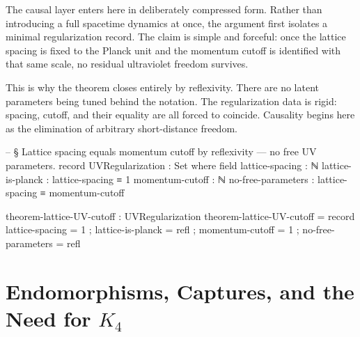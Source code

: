 \documentclass[11pt,a4paper]{book}
\begin{document}
The causal layer enters here in deliberately compressed form. Rather than introducing a full spacetime dynamics at once, the argument first isolates a minimal regularization record. The claim is simple and forceful: once the lattice spacing is fixed to the Planck unit and the momentum cutoff is identified with that same scale, no residual ultraviolet freedom survives.

This is why the theorem closes entirely by reflexivity. There are no latent parameters being tuned behind the notation. The regularization data is rigid: spacing, cutoff, and their equality are all forced to coincide. Causality begins here as the elimination of arbitrary short-distance freedom.

\begin{center}
\end{center}

\begin{code}

-- § Lattice spacing equals momentum cutoff by reflexivity — no free UV parameters.
record UVRegularization : Set where
  field
    lattice-spacing : ℕ
    lattice-is-planck : lattice-spacing ≡ 1
    momentum-cutoff : ℕ
    no-free-parameters : lattice-spacing ≡ momentum-cutoff

theorem-lattice-UV-cutoff : UVRegularization
theorem-lattice-UV-cutoff = record
  { lattice-spacing = 1
  ; lattice-is-planck = refl
  ; momentum-cutoff = 1
  ; no-free-parameters = refl
  }

\end{code}

\section{Endomorphisms, Captures, and the Need for $K_4$}
\end{document}
